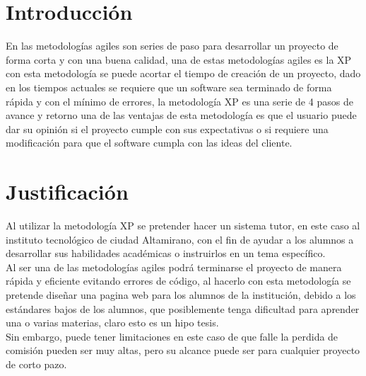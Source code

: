 \documentclass[letterpaper,oneside,openany,11pt]{book}
\begin{document}
\chapter{Introducción}\label{cap.introduccion}
\noindent  En las metodologías agiles son series de paso para desarrollar un proyecto de forma corta y con una buena calidad, una de estas metodologías agiles es la XP con esta metodología se puede acortar el tiempo de creación de un proyecto, dado en los tiempos actuales se requiere que un software sea terminado de forma rápida y con el mínimo de errores, la metodología XP es una serie de 4 pasos de avance y retorno una de las ventajas de esta metodología es que el usuario puede dar su opinión si el proyecto cumple con sus expectativas o si requiere una modificación para que el software cumpla con las ideas del cliente.\\



\chapter{Justificación}\label{cap.justificacion}
\noindent Al utilizar la metodología XP se pretender hacer un sistema tutor, en este caso al instituto tecnológico de ciudad Altamirano, con el fin de ayudar a los alumnos a desarrollar sus habilidades académicas o instruirlos en un tema específico.\\

Al ser una de las metodologías agiles podrá terminarse el proyecto de manera rápida y eficiente evitando errores de código, al hacerlo con esta metodología se pretende diseñar una pagina web para los alumnos de la institución, debido a los estándares bajos de los alumnos, que posiblemente tenga dificultad para aprender una o varias materias, claro esto es un hipo tesis.\\

Sin embargo, puede tener limitaciones en este caso de que falle la perdida de comisión pueden ser muy altas, pero su alcance puede ser para cualquier proyecto de corto pazo.\\
\end{document}
